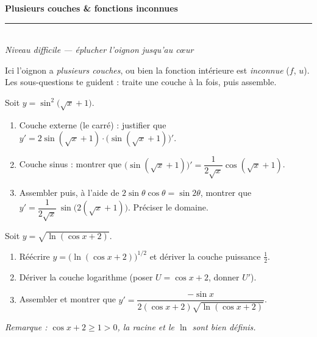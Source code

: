 \pagestyle{fancy}\fancyhf{}
\fancyfoot[C]{\small\thepage}
\renewcommand{\headrulewidth}{0.8pt}



\begin{center}
{\LARGE\bfseries\color{primarydark} Plusieurs couches \& fonctions inconnues}\\[2pt]
{\color{primary}\rule{0.5\textwidth}{1.2pt}}\\[4pt]
{\small\itshape Niveau difficile — éplucher l'oignon jusqu'au c\oe ur}
\end{center}
\vspace{2mm}

\begin{cle}[consigne]
Ici l'oignon a \emph{plusieurs couches}, ou bien la fonction intérieure est \emph{inconnue}
($f$, $u$). Les sous-questions te guident : traite une couche à la fois, puis assemble.
\end{cle}

\begin{exo}
Soit $y=\sin^2\!\big(\sqrt{x}+1\big)$.
\begin{enumerate}[label=\alph*),leftmargin=7mm,itemsep=2pt]
\item Couche externe (le carré) : justifier que $y'=2\sin(\sqrt x+1)\cdot\big(\sin(\sqrt x+1)\big)'$.
\item Couche sinus : montrer que $\big(\sin(\sqrt x+1)\big)'=\dfrac{1}{2\sqrt x}\cos(\sqrt x+1)$.
\item Assembler puis, à l'aide de $2\sin\theta\cos\theta=\sin 2\theta$, montrer que
      $y'=\dfrac{1}{2\sqrt x}\,\sin\!\big(2(\sqrt x+1)\big)$. Préciser le domaine.
\end{enumerate}
\end{exo}

\begin{exo}
Soit $y=\sqrt{\ln(\cos x+2)}$.
\begin{enumerate}[label=\alph*),leftmargin=7mm,itemsep=2pt]
\item Réécrire $y=\big(\ln(\cos x+2)\big)^{1/2}$ et dériver la couche puissance $\tfrac12$.
\item Dériver la couche logarithme (poser $U=\cos x+2$, donner $U'$).
\item Assembler et montrer que
      $y'=\dfrac{-\sin x}{2(\cos x+2)\sqrt{\ln(\cos x+2)}}$.
\end{enumerate}
{\footnotesize\itshape Remarque : $\cos x+2\ge 1>0$, la racine et le $\ln$ sont bien définis.}
\end{exo}

